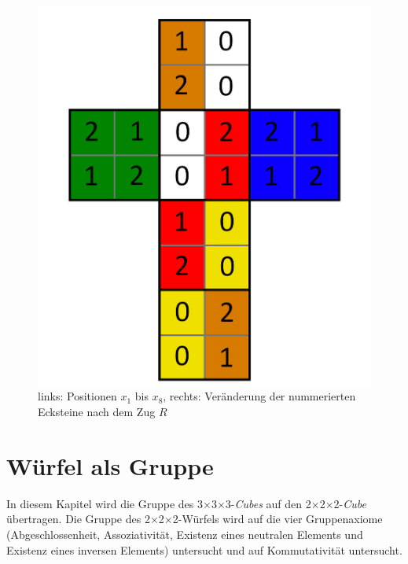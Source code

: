 \documentclass[12pt,a4paper, usenames, dvipsnames]{article}
\newcommand{\Ttwo}{2$\times$2$\times$2-}
\newcommand{\Tthree}{3$\times$3$\times$3-}
\begin{document}
\begin{figure}[h]
\includegraphics[scale=0.1]{foldedout_012_spin.png}
\caption[links: Positionen $x_1$ bis $x_8$, rechts: Veränderung der nummerierten Ecksteine nach dem Zug $R$]{links: Positionen $x_1$ bis $x_8$, rechts: Veränderung der nummerierten Ecksteine nach dem Zug $R$}
\label{7}
\end{figure}

%
%
%
%
%
%
%
%
%
%
\newpage
\section{Würfel als Gruppe}

In diesem Kapitel wird die Gruppe des \Tthree \textit{Cubes} auf den \Ttwo \textit{Cube} übertragen. Die Gruppe des \Ttwo Würfels wird auf die vier Gruppenaxiome (Abgeschlossenheit, Assoziativität, Existenz eines neutralen Elements und Existenz eines inversen Elements) untersucht und auf Kommutativität untersucht.

%
%
%
%
%
%
%
%
%
%
\end{document}
